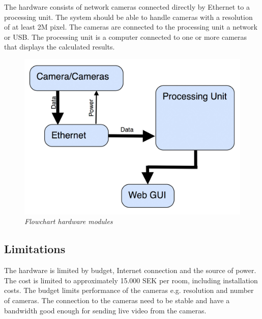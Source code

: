 

The hardware consists of network cameras connected directly by Ethernet to a processing unit. The system should be able to handle cameras with a resolution of at least 2M pixel. The cameras are connected to the processing unit a network or USB. 
The processing unit is a computer connected to one or more cameras that displays the calculated results. 

\begin{figure}[htb]
	\centering
	\includegraphics[width=160mm]{images/Hardware-flowchart.jpg}
	\caption[This text ends up at the list of figures]{\textit{Flowchart hardware modules}}
	\label{fig:block_overview_fig}  %
\end{figure}


\subsection{Limitations}
The hardware is limited by budget, Internet connection and the source of power. The cost is limited to approximately 15.000 SEK per room, including installation costs. The budget limits performance of the cameras e.g. resolution and number of cameras. The connection to the cameras need to be stable and have a bandwidth good enough for sending live video from the cameras.   
\newpage
